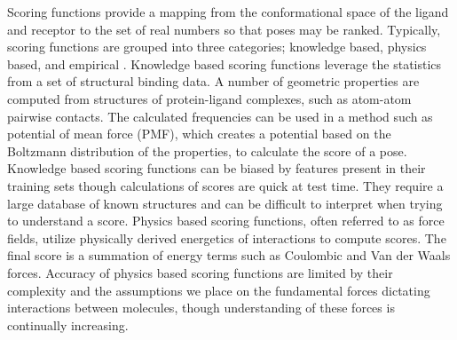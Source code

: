 \documentclass[linenumbers,doublespacing]{bmcart}
\begin{document}
Scoring functions provide a mapping from the conformational space of the ligand and receptor to the set of real numbers so that poses may be ranked. Typically, scoring functions are grouped into three categories; knowledge based, physics based, and empirical \cite{kitchen2004docking}. Knowledge based scoring functions leverage the statistics from a set of structural binding data. A number of geometric properties are computed from structures of protein-ligand complexes, such as atom-atom pairwise contacts. The calculated frequencies can be used in a method such as potential of mean force (PMF), which creates a potential based on the Boltzmann distribution of the properties, to calculate the score of a pose\cite{muegge1999general,muegge2000knowledge}. Knowledge based scoring functions can be biased by features present in their training sets though calculations of scores are quick at test time\cite{kitchen2004docking}. They require a large database of known structures and can be difficult to interpret when trying to understand a score\cite{brooijmans2003molecular}. Physics based scoring functions, often referred to as force fields, utilize physically derived energetics of interactions to compute scores. The final score is a summation of energy terms such as Coulombic and Van der Waals forces\cite{huang2006molecular}. Accuracy of physics based scoring functions are limited by their complexity and the assumptions we place on the fundamental forces dictating interactions between molecules, though understanding of these forces is continually increasing\cite{liu2015classification}. 
\end{document}
